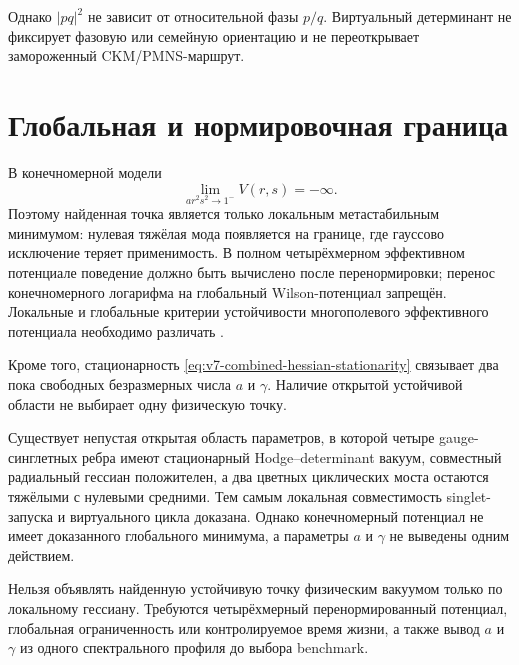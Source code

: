 Однако $|pq|^2$ не зависит от относительной фазы $p/q$. Виртуальный
детерминант не фиксирует фазовую или семейную ориентацию и не переоткрывает
замороженный CKM/PMNS-маршрут.

\section{Глобальная и нормировочная граница}

В конечномерной модели
\begin{equation}
 \lim_{ar^2s^2\to1^-}V(r,s)=-\infty.
 \label{eq:v7-combined-hessian-boundary-divergence}
\end{equation}
Поэтому найденная точка является только локальным метастабильным минимумом:
нулевая тяжёлая мода появляется на границе, где гауссово исключение теряет
применимость. В полном четырёхмерном эффективном потенциале поведение должно
быть вычислено после перенормировки; перенос конечномерного логарифма на
глобальный Wilson-потенциал запрещён. Локальные и глобальные критерии
устойчивости многополевого эффективного потенциала необходимо различать
\cite{v7-combined-hessian-cw,v7-combined-hessian-kannike}.

Кроме того, стационарность \eqref{eq:v7-combined-hessian-stationarity}
связывает два пока свободных безразмерных числа $a$ и $\gamma$. Наличие
открытой устойчивой области не выбирает одну физическую точку.

\begin{theorem}
Существует непустая открытая область параметров, в которой четыре
gauge-синглетных ребра имеют стационарный Hodge--determinant вакуум,
совместный радиальный гессиан положителен, а два цветных циклических моста
остаются тяжёлыми с нулевыми средними. Тем самым локальная совместимость
singlet-запуска и виртуального цикла доказана. Однако конечномерный
потенциал не имеет доказанного глобального минимума, а параметры $a$ и
$\gamma$ не выведены одним действием.
\end{theorem}

\begin{nogocriterion}
Нельзя объявлять найденную устойчивую точку физическим вакуумом только по
локальному гессиану. Требуются четырёхмерный перенормированный потенциал,
глобальная ограниченность или контролируемое время жизни, а также вывод
$a$ и $\gamma$ из одного спектрального профиля до выбора benchmark.
\end{nogocriterion}

